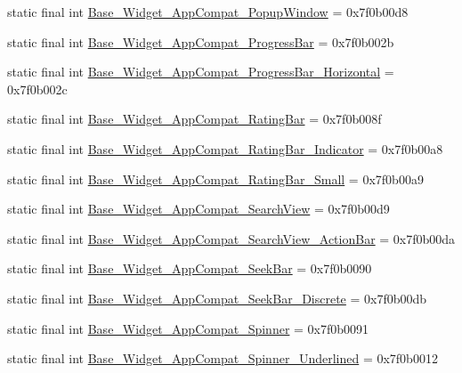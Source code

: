 \begin{CompactItemize}
static final int \hyperlink{classandroid_1_1support_1_1graphics_1_1drawable_1_1_r_1_1style_8a358f0726b37799406b73c529fcd19d}{Base\_\-Widget\_\-AppCompat\_\-PopupWindow} = 0x7f0b00d8
\item 
static final int \hyperlink{classandroid_1_1support_1_1graphics_1_1drawable_1_1_r_1_1style_c2e34702bbc09521b664b2bcde940453}{Base\_\-Widget\_\-AppCompat\_\-ProgressBar} = 0x7f0b002b
\item 
static final int \hyperlink{classandroid_1_1support_1_1graphics_1_1drawable_1_1_r_1_1style_76c20d80aba94cd52d57d25113e332aa}{Base\_\-Widget\_\-AppCompat\_\-ProgressBar\_\-Horizontal} = 0x7f0b002c
\item 
static final int \hyperlink{classandroid_1_1support_1_1graphics_1_1drawable_1_1_r_1_1style_911b1b8ab63cd199f7eb2bc8f0b0c219}{Base\_\-Widget\_\-AppCompat\_\-RatingBar} = 0x7f0b008f
\item 
static final int \hyperlink{classandroid_1_1support_1_1graphics_1_1drawable_1_1_r_1_1style_027d5e6a05e574f0760ff5c7d05fd835}{Base\_\-Widget\_\-AppCompat\_\-RatingBar\_\-Indicator} = 0x7f0b00a8
\item 
static final int \hyperlink{classandroid_1_1support_1_1graphics_1_1drawable_1_1_r_1_1style_b762a718ab1b6e2c00c8a9c1211b2fbb}{Base\_\-Widget\_\-AppCompat\_\-RatingBar\_\-Small} = 0x7f0b00a9
\item 
static final int \hyperlink{classandroid_1_1support_1_1graphics_1_1drawable_1_1_r_1_1style_3cc34cf4b3dad5a513cd2f514e6b0e57}{Base\_\-Widget\_\-AppCompat\_\-SearchView} = 0x7f0b00d9
\item 
static final int \hyperlink{classandroid_1_1support_1_1graphics_1_1drawable_1_1_r_1_1style_9c0fb9db5ed99c00d8f3bfad97009ce5}{Base\_\-Widget\_\-AppCompat\_\-SearchView\_\-ActionBar} = 0x7f0b00da
\item 
static final int \hyperlink{classandroid_1_1support_1_1graphics_1_1drawable_1_1_r_1_1style_4d2a1c4340e3af5082cd765e54d4ee56}{Base\_\-Widget\_\-AppCompat\_\-SeekBar} = 0x7f0b0090
\item 
static final int \hyperlink{classandroid_1_1support_1_1graphics_1_1drawable_1_1_r_1_1style_834b9162d1bcd9fd548ee4ff972468ca}{Base\_\-Widget\_\-AppCompat\_\-SeekBar\_\-Discrete} = 0x7f0b00db
\item 
static final int \hyperlink{classandroid_1_1support_1_1graphics_1_1drawable_1_1_r_1_1style_71152067a8f23bfc7c240d341fad1062}{Base\_\-Widget\_\-AppCompat\_\-Spinner} = 0x7f0b0091
\item 
static final int \hyperlink{classandroid_1_1support_1_1graphics_1_1drawable_1_1_r_1_1style_9c2b10f2902f61ab861a48445c57ac41}{Base\_\-Widget\_\-AppCompat\_\-Spinner\_\-Underlined} = 0x7f0b0012

\end{CompactItemize}
